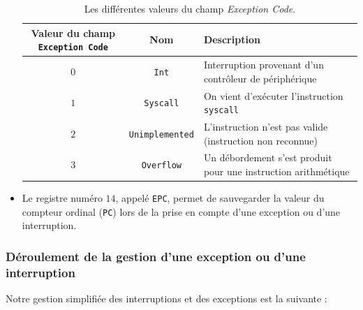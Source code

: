 \documentclass[12pt]{article}
\begin{document}
\begin{itemize}
\begin{table}[!htpb]
\begin{center}
\begin{tabular}{|c|c|p{7cm}|}
\hline
Valeur du champ \verb+Exception Code+ & Nom & Description\\
\hline
\hline
$0$ & \verb+Int+ & Interruption provenant d'un contrôleur de périphérique\\
\hline
$1$ & \verb+Syscall+ & On vient d'exécuter l'instruction \verb+syscall+\\
\hline
$2$ & \verb+Unimplemented+ & L'instruction n'est pas valide (instruction non reconnue)\\
\hline
$3$ & \verb+Overflow+ & Un débordement s'est produit pour une instruction arithmétique\\
\hline
\end{tabular}
\end{center}
\caption{Les différentes valeurs du champ \emph{Exception Code}.}
\label{table:int}
\end{table}

\vspace{0.5cm}

\item Le registre numéro $14$, appelé \verb+EPC+, permet de sauvegarder la valeur du compteur ordinal (\verb+PC+) lors de la prise en compte
d'une exception ou d'une interruption.

\end{itemize}

\subsubsection{Déroulement de la gestion d'une exception ou d'une interruption}

Notre gestion simplifiée des interruptions et des exceptions est la suivante :
\end{document}
